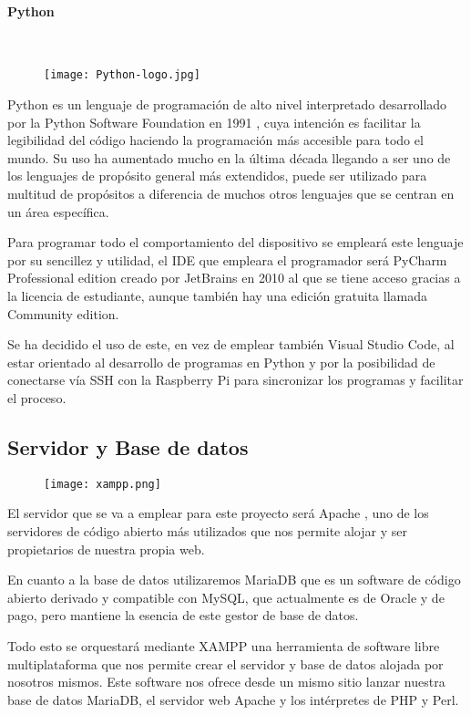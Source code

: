 \paragraph{Python}\mbox{} \\
\begin{figure}[H]
	{\texttt{[image: Python-logo.jpg]}}
\end{figure}
Python es un lenguaje de programación de alto nivel interpretado desarrollado por la Python Software Foundation en 1991 \cite{montoro_python_2012}, cuya intención es facilitar la legibilidad del código haciendo la programación más accesible para todo el mundo. Su uso ha aumentado mucho en la última década llegando a ser uno de los lenguajes de propósito general más extendidos, puede ser utilizado para multitud de propósitos a diferencia de muchos otros lenguajes que se centran en un área específica.

Para programar todo el comportamiento del dispositivo se empleará este lenguaje por su sencillez y utilidad, el IDE que empleara el programador será PyCharm Professional edition creado por JetBrains en 2010 \cite{noauthor_pycharm_2021} al que se tiene acceso gracias a la licencia de estudiante, aunque también hay una edición gratuita llamada Community edition.

Se ha decidido el uso de este, en vez de emplear también Visual Studio Code, al estar orientado al desarrollo de programas en Python y por la posibilidad de conectarse vía SSH con la Raspberry Pi para sincronizar los programas y facilitar el proceso.

\subsection{Servidor y Base de datos}\label{subsec:servidorDB}
\begin{figure}[H]
	{\texttt{[image: xampp.png]}}
\end{figure}
El servidor que se va a emplear para este proyecto será Apache \cite{noauthor_apache_nodate}, uno de los servidores de código abierto más utilizados que nos permite alojar y ser propietarios de nuestra propia web.

En cuanto a la base de datos utilizaremos MariaDB \cite{noauthor_mariadb_nodate} que es un software de código abierto derivado y compatible con MySQL, que actualmente es de Oracle y de pago, pero mantiene la esencia de este gestor de base de datos.

Todo esto se orquestará mediante XAMPP una herramienta de software libre multiplataforma \cite{noauthor_xampp_nodate} que nos permite crear el servidor y base de datos alojada por nosotros mismos. Este software nos ofrece desde un mismo sitio lanzar nuestra base de datos MariaDB, el servidor web Apache y los intérpretes de PHP y Perl.